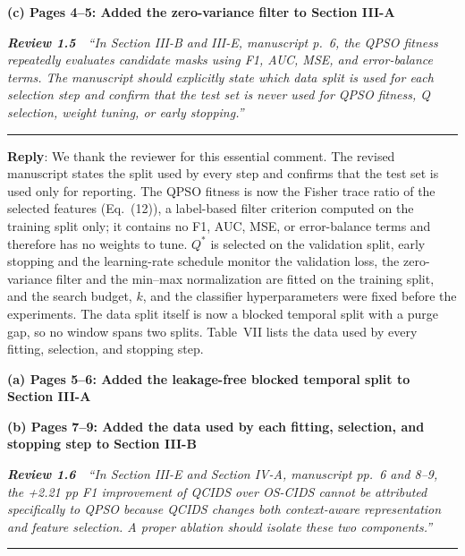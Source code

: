 \documentclass[11pt]{article}
\newcommand{\review}[2]{\par\bigskip\noindent\textbf{\textit{Review #1}}\ \ \textit{``#2''}\par\smallskip\hrule\medskip}
\newcommand{\reply}{\noindent\textbf{Reply}: }
\newcommand{\loc}[1]{\par\medskip\noindent\textbf{#1}\par}
\begin{document}
\loc{(c) Pages 4--5: Added the zero-variance filter to Section III-A}

\review{1.5}{In Section III-B and III-E, manuscript p.~6, the QPSO fitness repeatedly evaluates candidate masks using F1, AUC, MSE, and error-balance terms. The manuscript should explicitly state which data split is used for each selection step and confirm that the test set is never used for QPSO fitness, Q selection, weight tuning, or early stopping.}

\reply We thank the reviewer for this essential comment. The revised
manuscript states the split used by every step and confirms that the test
set is used only for reporting. The QPSO fitness is now the Fisher trace
ratio of the selected features (Eq.~(12)), a label-based filter criterion
computed on the training split only; it contains no F1, AUC, MSE, or
error-balance terms and therefore has no weights to tune. $Q^{*}$ is
selected on the validation split, early stopping and the learning-rate
schedule monitor the validation loss, the zero-variance filter and the
min--max normalization are fitted on the training split, and the search
budget, $k$, and the classifier hyperparameters were fixed before the
experiments. The data split itself is now a blocked temporal split with a
purge gap, so no window spans two splits. Table~VII lists the data used by
every fitting, selection, and stopping step.

\loc{(a) Pages 5--6: Added the leakage-free blocked temporal split to Section III-A}

\loc{(b) Pages 7--9: Added the data used by each fitting, selection, and stopping step to Section III-B}

\review{1.6}{In Section III-E and Section IV-A, manuscript pp.~6 and 8--9, the +2.21 pp F1 improvement of QCIDS over OS-CIDS cannot be attributed specifically to QPSO because QCIDS changes both context-aware representation and feature selection. A proper ablation should isolate these two components.}
\end{document}
